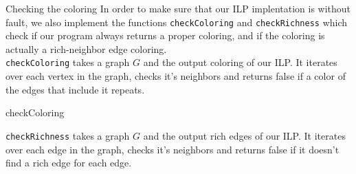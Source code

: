 \documentclass[12pt,a4paper]{amsart}
\makeatletter
\renewcommand\section{\@startsection{section}{1}
  \z@{.5\linespacing\@plus.7\linespacing}{.5\linespacing}
  {\normalfont\scshape\large\centering}}
\theoremstyle{definition} %
\theoremstyle{plain} %
\makeatother
\begin{document}
\section{Checking the coloring} 
    In order to make sure that our ILP implentation is without fault, we also implement the functions \texttt{checkColoring} and \texttt{checkRichness} which check if our program always returns a proper coloring, and if the coloring is actually a rich-neighbor edge coloring.\\ 

    \texttt{checkColoring} takes a graph $G$ and the output coloring of our ILP. It iterates over each vertex in the graph, checks it's neighbors and returns false if a color of the edges that include it  repeats. \\

    \begin{algorithm}[!htbp]
        \caption{checkColoring}\label{algo:checkColoring}
        \LinesNumberedHidden
        \DontPrintSemicolon



        \Return {}\;
    \end{algorithm}

    \texttt{checkRichness} takes a graph $G$ and the output rich edges of our ILP. It iterates over each edge in the graph, checks it's neighbors and returns false if it doesn't find a rich edge for each edge.\\
\end{document}
